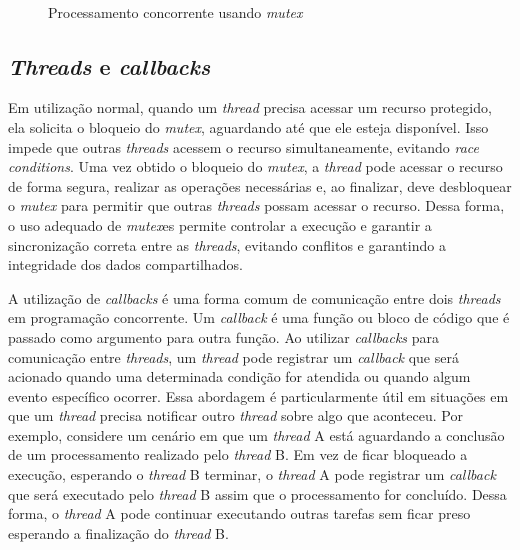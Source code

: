 \begin{figure}[ht]
	\centering
	\caption{Processamento concorrente usando \textit{mutex}}
	\\
	\label{fig:mutex}
\end{figure}

\subsection{\textit{Threads} e \textit{callbacks}}

Em utilização normal, quando um \textit{thread} precisa acessar um recurso protegido, ela solicita o bloqueio do \textit{mutex}, aguardando até que ele esteja disponível. Isso impede que outras \textit{threads} acessem o recurso simultaneamente, evitando \textit{race conditions}. Uma vez obtido o bloqueio do \textit{mutex}, a \textit{thread} pode acessar o recurso de forma segura, realizar as operações necessárias e, ao finalizar, deve desbloquear o \textit{mutex} para permitir que outras \textit{threads} possam acessar o recurso. Dessa forma, o uso adequado de \textit{mutex}es permite controlar a execução e garantir a sincronização correta entre as \textit{threads}, evitando conflitos e garantindo a integridade dos dados compartilhados.

A utilização de \textit{callbacks} é uma forma comum de comunicação entre dois \textit{threads} em programação concorrente. Um \textit{callback} é uma função ou bloco de código que é passado como argumento para outra função. Ao utilizar \textit{callbacks} para comunicação entre \textit{threads}, um \textit{thread} pode registrar um \textit{callback} que será acionado quando uma determinada condição for atendida ou quando algum evento específico ocorrer. Essa abordagem é particularmente útil em situações em que um \textit{thread} precisa notificar outro \textit{thread} sobre algo que aconteceu. Por exemplo, considere um cenário em que um \textit{thread} A está aguardando a conclusão de um processamento realizado pelo \textit{thread} B. Em vez de ficar bloqueado a execução, esperando o \textit{thread} B terminar, o \textit{thread} A pode registrar um \textit{callback} que será executado pelo \textit{thread} B assim que o processamento for concluído. Dessa forma, o \textit{thread} A pode continuar executando outras tarefas sem ficar preso esperando a finalização do \textit{thread} B.

